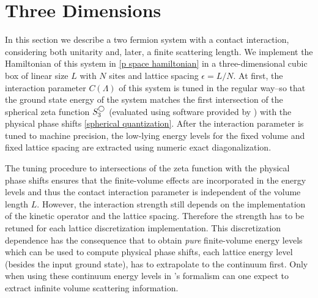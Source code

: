 \section{Three Dimensions}\label{sec:3D}

In this section we describe a two fermion system with a contact interaction, considering both unitarity and, later, a finite scattering length.
We implement the Hamiltonian of this system in \eqref{p space hamiltonian} in a three-dimensional cubic box of linear size $L$ with $N$ sites and lattice spacing $\epsilon=L/N$.
At first, the interaction parameter $C(\Lambda)$ of this system is tuned in the regular way--so that the ground state energy of the system matches the first intersection of the spherical zeta function $S^{\bigcirc}_3$ (evaluated using software provided by ) with the physical phase shifts \eqref{spherical quantization}.
After the interaction parameter is tuned to machine precision, the low-lying energy levels for the fixed volume and fixed lattice spacing are extracted using numeric exact diagonalization.

The tuning procedure to intersections of the zeta function with the physical phase shifts ensures that the finite-volume effects are incorporated in the energy levels and thus the contact interaction parameter is independent of the volume length $L$.
However, the interaction strength still depends on the implementation of the kinetic operator and the lattice spacing.
Therefore the strength has to be retuned for each lattice discretization implementation.
This discretization dependence has the consequence that to obtain \textit{pure} finite-volume energy levels which can be used to compute physical phase shifts, each lattice energy level (besides the input ground state), has to extrapolate to the continuum first.
Only when using these continuum energy levels in \Luscher's formalism can one expect to extract infinite volume scattering information.

